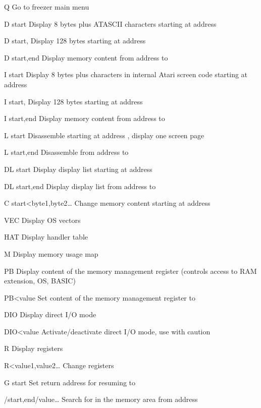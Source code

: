 \begin{fcmdlist}
\item[Q] 
Go to freezer main menu
\item[D start]
Display 8 bytes plus ATASCII characters starting at address  
\item[D start,]
Display 128 bytes starting at address 
\item[D start,end]
Display memory content from address  to 
\item[I start]
Display 8 bytes plus characters in internal Atari screen code starting at address  
\item[I start,]
Display 128 bytes starting at address 
\item[I start,end]
Display memory content from address  to 
\item[L start]
Disassemble starting at address , display one screen page
\item[L start,end]
Disassemble from address  to 
\item[DL start]
Display display list starting at address 
\item[DL start,end]
Display display list from address  to 
\item[C start{\textless}byte1,byte2{\dots}]
Change memory content starting at address 
\item[VEC]
Display OS vectors
\item[HAT]
Display handler table
\item[M]
Display memory usage map
\item[PB]
Display content of the memory management register  (controls
access to RAM extension, OS, BASIC)
\item[PB{\textless}value]
Set content of the  memory management register  to  
\item[DIO]
Display direct I/O mode
\item[DIO{\textless}value]
Activate/deactivate direct I/O mode, use with caution
\item[R]
Display registers 
\item[R{\textless}value1,value2\dots]
Change registers
\item[G start]
Set return address for resuming to 
\item[/start,end/value\dots]
Search for  in the memory area from address

\end{fcmdlist}
